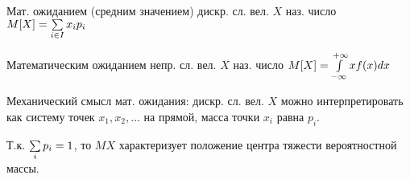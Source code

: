 
\OPR Мат. ожиданием (средним значением) дискр. сл. вел. $X$ наз. число $M[X]=\sum\limits_{i\in I}x_i p_i$

\OPR Математическим ожиданием непр. сл. вел. $X$ наз. число $M[X]=\int\limits_{-\infty}^{+\infty}xf(x)dx$

Механический смысл мат. ожидания: дискр. сл. вел. $X$ можно интерпретировать как систему точек $x_1,x_2,...$ на прямой, масса точки $x_i$ равна $p_i$. 

Т.к. $\sum\limits_{i}p_i = 1$, то $MX$ характеризует положение центра тяжести вероятностной массы.

